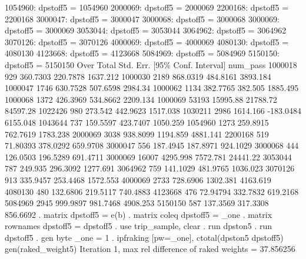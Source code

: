       1054960: dpstoff5 = 1054960
      2000069: dpstoff5 = 2000069
      2200168: dpstoff5 = 2200168
      3000047: dpstoff5 = 3000047
      3000068: dpstoff5 = 3000068
      3000069: dpstoff5 = 3000069
      3053044: dpstoff5 = 3053044
      3064962: dpstoff5 = 3064962
      3070126: dpstoff5 = 3070126
      4000069: dpstoff5 = 4000069
      4080130: dpstoff5 = 4080130
      4123668: dpstoff5 = 4123668
      5084969: dpstoff5 = 5084969
      5150150: dpstoff5 = 5150150
{\smallskip}
        Over {\VBAR}      Total   Std. Err.     [95\% Conf. Interval]
num_pass     {\VBAR}
     1000018 {\VBAR}        929   360.7303      220.7878    1637.212
     1000030 {\VBAR}       2189   868.0319      484.8161    3893.184
     1000047 {\VBAR}       1746   630.7528      507.6598     2984.34
     1000062 {\VBAR}       1134   382.7765       382.505    1885.495
     1000068 {\VBAR}       1372   426.3969      534.8662    2209.134
     1000069 {\VBAR}      53193   15995.88      21788.72    84597.28
     1022426 {\VBAR}        980    273.542      442.9623    1517.038
     1030211 {\VBAR}       2986   1614.166     -183.0484    6155.048
     1043644 {\VBAR}        737   159.5597      423.7407    1050.259
     1054960 {\VBAR}       1273   259.8915      762.7619    1783.238
     2000069 {\VBAR}       3038   938.8099      1194.859    4881.141
     2200168 {\VBAR}        519   71.80393      378.0292    659.9708
     3000047 {\VBAR}        556   187.4945      187.8971    924.1029
     3000068 {\VBAR}        444   126.0503      196.5289    691.4711
     3000069 {\VBAR}      16007   4295.998      7572.781    24441.22
     3053044 {\VBAR}        787    249.935      296.3092    1277.691
     3064962 {\VBAR}        759   141.1029      481.9765    1036.023
     3070126 {\VBAR}        913   335.9457      253.4468    1572.553
     4000069 {\VBAR}       2733   728.6906      1302.381    4163.619
     4080130 {\VBAR}        480   132.6806      219.5117    740.4883
     4123668 {\VBAR}        476   72.94794      332.7832    619.2168
     5084969 {\VBAR}       2945   999.9897      981.7468    4908.253
     5150150 {\VBAR}        587   137.3569      317.3308    856.6692
{\smallskip}
. matrix dpstoff5 = e(b)
{\smallskip}
. matrix coleq dpstoff5 = _one
{\smallskip}
. matrix rownames dpstoff5 = dpstoff5
{\smallskip}
. use trip_sample, clear
{\smallskip}
. run dpston5
{\smallskip}
. run dpstoff5
{\smallskip}
. gen byte _one = 1       
{\smallskip}
. ipfraking [pw=_one], ctotal(dpston5 dpstoff5) gen(raked_weight5)
{\smallskip}
 Iteration 1, max rel difference of raked weights = 37.856256
